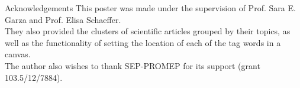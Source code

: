 \documentclass[a0paper, portrait]{baposter}
\begin{document}
\begin{poster}
  \begin{posterbox}[column=2, name=credits, below=ref] {Acknowledgements} {
      This poster was made under the supervision of Prof. Sara E. Garza and Prof. Elisa Schaeffer.\\
      They also provided the clusters of scientific articles grouped by their topics, as well as the functionality of setting the location of each of the tag words in a canvas. \\
      The author also wishes to thank SEP-PROMEP for its support (grant 103.5/12/7884).
    }
  \end{posterbox}

\end{poster}
\end{document}
